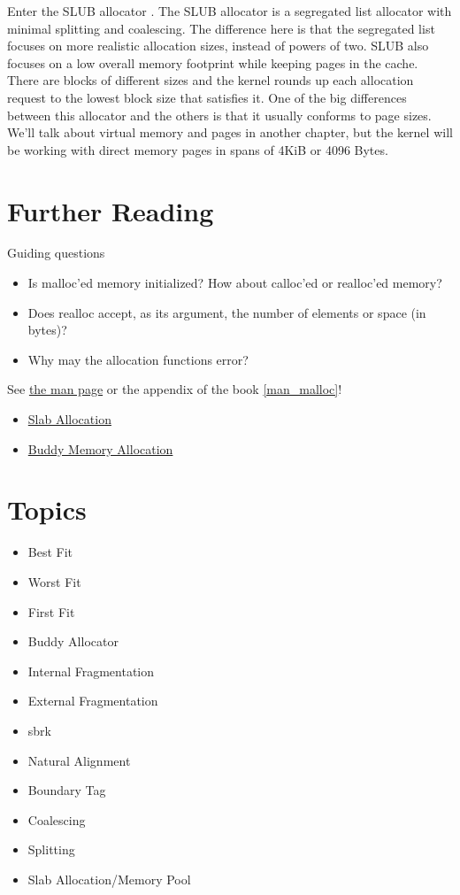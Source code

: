 Enter the SLUB allocator .
The SLUB allocator is a segregated list allocator with minimal splitting and coalescing.
The difference here is that the segregated list focuses on more realistic allocation sizes, instead of powers of two.
SLUB also focuses on a low overall memory footprint while keeping pages in the cache.
There are blocks of different sizes and the kernel rounds up each allocation request to the lowest block size that satisfies it.
One of the big differences between this allocator and the others is that it usually conforms to page sizes.
We'll talk about virtual memory and pages in another chapter, but the kernel will be working with direct memory pages in spans of 4KiB or 4096 Bytes.

\section{Further Reading}

Guiding questions

\begin{itemize}
\item Is malloc'ed memory initialized? How about calloc'ed or realloc'ed memory?
\item Does realloc accept, as its argument, the number of elements or space (in bytes)?
\item Why may the allocation functions error?
\end{itemize}

See \href{http://man7.org/linux/man-pages/man3/malloc.3.html}{the man page} or the appendix of the book \ref{man_malloc}!

\begin{itemize}
\item \href{https://en.wikipedia.org/wiki/Slab_allocation}{Slab Allocation}
\item
  \href{http://en.wikipedia.org/wiki/Buddy_memory_allocation}{Buddy Memory Allocation}
\end{itemize}

\section{Topics}

\begin{itemize}
\item
  Best Fit
\item
  Worst Fit
\item
  First Fit
\item
  Buddy Allocator
\item
  Internal Fragmentation
\item
  External Fragmentation
\item
  sbrk
\item
  Natural Alignment
\item
  Boundary Tag
\item
  Coalescing
\item
  Splitting
\item
  Slab Allocation/Memory Pool
\end{itemize}

